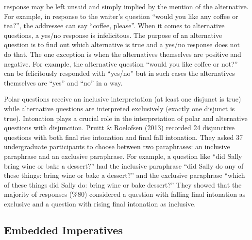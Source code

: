 \documentclass[oneside]{report}
\theoremstyle{definition}
\theoremstyle{definition}
\theoremstyle{definition}
\theoremstyle{remark}
\begin{document}
response may be left unsaid and simply implied by the mention of the
alternative. For example, in response to the waiter's question ``would
you like any coffee or tea?'', the addressee can say ``coffee, please''.
When it comes to alternative questions, a yes/no response is
infelicitous. The purpose of an alternative question is to find out
which alternative is true and a yes/no response does not do that. The
one exception is when the alternatives themselves are positive and
negative. For example, the alternative question ``would you like coffee
or not?'' can be felicitously responded with ``yes/no'' but in such
cases the alternatives themselves are ``yes'' and ``no'' in a way.

Polar questions receive an inclusive interpretation (at least one
disjunct is true) while alternative questions are interpreted
exclusively (exactly one disjunct is true). Intonation plays a crucial
role in the interpretation of polar and alternative questions with
disjunction. Pruitt \& Roelofsen (2013) recorded 24 disjunctive
questions with both final rise intonation and final fall intonation.
They asked 37 undergraduate participants to choose between two
paraphrases: an inclusive paraphrase and an exclusive paraphrase. For
example, a question like ``did Sally bring wine or bake a dessert?'' had
the inclusive paraphrase ``did Sally do any of these things: bring wine
or bake a dessert?'' and the exclusive paraphrase ``which of these
things did Sally do: bring wine or bake dessert?'' They showed that the
majority of responses (\%80) considered a question with falling final
intonation as exclusive and a question with rising final intonation as
inclusive.

\subsection{Embedded Imperatives}\label{embedded-imperatives}
\end{document}
